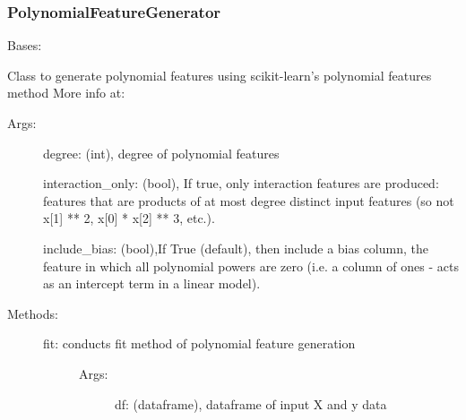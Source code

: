 \documentclass[letterpaper,10pt,english]{sphinxmanual}
\begin{document}
\subsubsection{PolynomialFeatureGenerator}
\label{\detokenize{api/mastml.feature_generators.PolynomialFeatureGenerator:polynomialfeaturegenerator}}\label{\detokenize{api/mastml.feature_generators.PolynomialFeatureGenerator::doc}}

\begin{fulllineitems}
\label{\detokenize{api/mastml.feature_generators.PolynomialFeatureGenerator:mastml.feature_generators.PolynomialFeatureGenerator}}
Bases: {\hyperref[\detokenize{api/mastml.feature_generators.BaseGenerator:mastml.feature_generators.BaseGenerator}]{}}

Class to generate polynomial features using scikit-learn’s polynomial features method
More info at: 
\begin{description}
\item[{Args:}] \leavevmode
degree: (int), degree of polynomial features

interaction\_only: (bool), If true, only interaction features are produced: features that are products of at most degree distinct input features (so not x{[}1{]} ** 2, x{[}0{]} * x{[}2{]} ** 3, etc.).

include\_bias: (bool),If True (default), then include a bias column, the feature in which all polynomial powers are zero (i.e. a column of ones - acts as an intercept term in a linear model).

\item[{Methods:}] \leavevmode\begin{description}
\item[{fit: conducts fit method of polynomial feature generation}] \leavevmode\begin{description}
\item[{Args:}] \leavevmode
df: (dataframe), dataframe of input X and y data


\end{description}
\end{description}
\end{description}
\end{fulllineitems}
\end{document}

